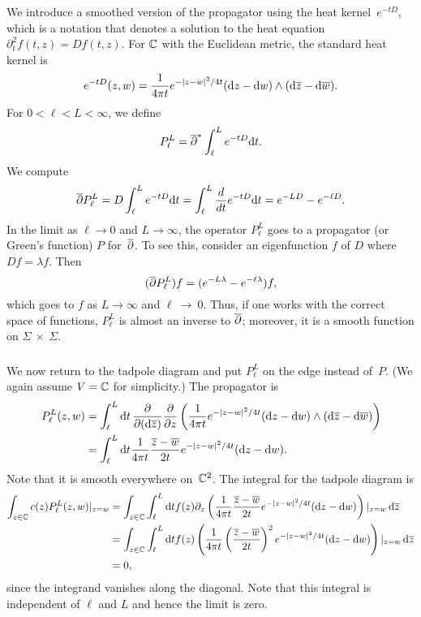 
We introduce a smoothed version of the propagator using the heat kernel~$e^{-tD}$,
which is a notation that denotes a solution to the heat equation $\partial_t^2 f(t,z) = Df(t,z)$.
For $\mathbb C$ with the Euclidean metric, the standard heat kernel is
\[
e^{-tD}(z,w) =  \frac{1}{4\pi t} e^{-|z-w|^2/4t} ({\rm d} z - {\rm d} w) \wedge ({\rm d}\overline{z} - {\rm d}\overline{w}). 
\]
For $0 < \ell < L < \infty$, we define
\[
P_\ell^L = \overline{\partial}^* \int_{\ell}^L e^{-tD}{\rm d} t.
\]
We compute
\[
\overline{\partial} P_\ell^L = D \int_{\ell}^L e^{-tD}{\rm d} t =  \int_{\ell}^L \frac{d}{dt} e^{-tD}{\rm d} t = e^{-LD} - e^{-\ell D}.
\]
In the limit as $\ell \to 0$ and $L \to \infty$, the operator $P_\ell^L$ goes to a propagator (or Green's function) $P$ for~$\overline{\partial}$.
To see this, consider an eigenfunction $f$ of $D$ where $Df=\lambda f$.
Then
\[
(\overline{\partial} P_\ell^L) f = (e^{-L\lambda} - e^{-\ell \lambda})f, 
\]
which goes to $f$ as $L \to \infty$ and $\ell~\to~0$.
Thus, if one works with the correct space of functions, 
$P_\ell^L$ is almost an inverse to $\overline{\partial}$;
moreover, it is a smooth function on $\Sigma~\times~\Sigma$.

\subsubsection{}

We now return to the tadpole diagram and put $P_\ell^L$ on the edge instead of~$P$.
(We again assume $V = \mathbb C$ for simplicity.)
The propagator is
\begin{align*}
P_\ell^L(z,w) &= \int_{\ell}^L {\rm d} t \, \frac{\partial}{\partial ({\rm d} \overline{z})} \frac{\partial}{\partial z}\left( \frac{1}{4\pi t} e^{-|z-w|^2/4t} ({\rm d} z - {\rm d} w) \wedge ({\rm d}\overline{z} - {\rm d}\overline{w})\right)\\
&= \int_{\ell}^L {\rm d} t \frac{1}{4\pi t} \frac{\overline{z} - \overline{w}}{2t} e^{-|z-w|^2/4t} ({\rm d} z - {\rm d} w).
\end{align*}
Note that it is smooth everywhere on~$\mathbb C^2$.
The integral for the tadpole diagram is 
\begin{align*}
\int_{z \in \mathbb C} c(z)P_\ell^L(z,w)|_{z = w}  
&= \int_{z \in \mathbb C} \int_{\ell}^L {\rm d} t f(z) \partial_z \left(\frac{1}{4\pi t} \frac{\overline{z} - \overline{w}}{2t} e^{-|z-w|^2/4t} ({\rm d} z - {\rm d} w) \right)|_{z = w}\, {\rm d} \overline{z}\\
&= \int_{z \in \mathbb C} \int_{\ell}^L {\rm d} t f(z) \left(\frac{1}{4\pi t} \left(\frac{\overline{z} - \overline{w}}{2t}\right)^2 e^{-|z-w|^2/4t} ({\rm d} z - {\rm d} w) \right)|_{z = w}\, {\rm d} \overline{z}\\
&= 0,
\end{align*}
since the integrand vanishes along the diagonal.
Note that this integral is independent of $\ell$ and $L$ and hence the limit is zero.

